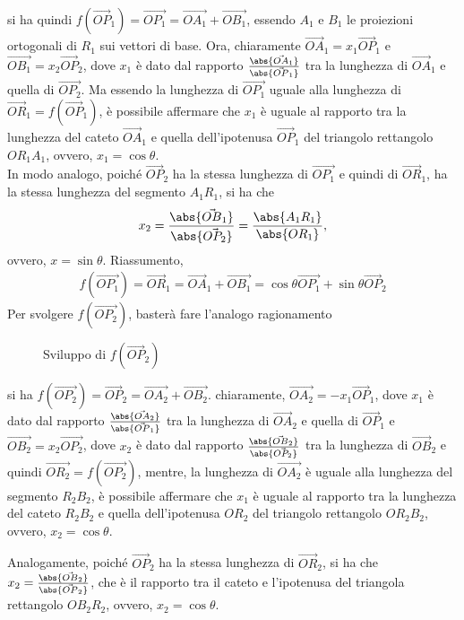 \begin{es}
\begin{enumerate}
    si ha quindi $f\left(\vec{OP}_1\right)=\vec{OP_1}=\vec{OA_1}+\vec{OB_1}$,
    essendo $A_1$ e $B_1$ le proiezioni ortogonali di $R_1$ sui vettori di
    base. Ora, chiaramente $\vec{OA}_1=x_1\vec{OP}_1$ e $\vec{OB_1}=x_2\vec{OP}_2$,
    dove $x_1$ è dato dal rapporto $\frac{\abs{\vec{OA}_1}}{\abs{\vec{OP}_1}}$ tra
    la lunghezza di $\vec{OA}_1$ e quella di $\vec{OP_2}$. Ma essendo la lunghezza
    di $\vec{OP_1}$ uguale alla lunghezza di $\vec{OR}_1=f(\vec{OP}_1)$, è possibile
    affermare che $x_1$ è uguale al rapporto tra la lunghezza del cateto $\vec{OA}_1$
    e quella dell'ipotenusa $\vec{OP}_1$ del triangolo rettangolo $OR_1A_1$, ovvero,
    $x_1=\cos\theta$.\\
    In modo analogo, poiché $\vec{OP}_2$ ha la stessa lunghezza di $\vec{OP_1}$ e
    quindi di $\vec{OR}_1$, ha la stessa lunghezza del segmento $A_1R_1$, si ha
    che
    \clearpage
    \begin{eqnarray*}
      x_2=\frac{\abs{\vec{OB}_1}}{\abs{\vec{OP_2}}}=\frac{\abs{A_1R_1}}{\abs{OR_1}},
    \end{eqnarray*}
    ovvero, $x=\sin\theta$. Riassumento,
    \begin{eqnarray}
      \label{eq:mtxAsaplin8}
      f(\vec{OP_1})=\vec{OR}_1=\vec{OA}_1+\vec{OB_1}=\cos{\theta}\vec{OP_1}+\sin\theta
      \vec{OP}_2
    \end{eqnarray}
    Per svolgere $f(\vec{OP_2})$, basterà fare l'analogo ragionamento
    \begin{figure}[ht!]
      \centering
      \resizebox{8cm}{!}{}
      \caption{Sviluppo di $f(\vec{OP}_2)$}
      \label{fig:mtxAsaplin3}
    \end{figure}

    si ha $f(\vec{OP_2})=\vec{OP}_2=\vec{OA_2}+\vec{OB_2}$. chiaramente,
    $\vec{OA_2}=-x_1\vec{OP}_1$, dove $x_1$ è dato dal rapporto $\frac{\abs{\vec{OA}_2}}
    {\abs{\vec{OP}_1}}$ tra la lunghezza di $\vec{OA}_2$ e quella di $\vec{OP}_1$ e
    $\vec{OB_2}=x_2\vec{OP_2}$, dove $x_2$ è dato dal rapporto $\frac{\abs{\vec{OB}_2}}
    {\abs{\vec{OP_2}}}$ tra la lunghezza di $\vec{OB}_2$ e quindi $\vec{OR_2}=f(\vec{OP_2})$,
    mentre, la lunghezza di $\vec{OA_2}$ è uguale alla lunghezza del segmento $R_2B_2$, è
    possibile affermare che $x_1$ è uguale al rapporto tra la lunghezza del cateto $R_2B_2$
    e quella dell'ipotenusa $OR_2$ del triangolo rettangolo $OR_2B_2$, ovvero, $x_2=\cos\theta$.
    
    Analogamente, poiché $\vec{OP}_2$ ha la stessa lunghezza di
    $\vec{OR}_2$, si ha che $x_2=\frac{\abs{\vec{OB}_2}}
    {\abs{\vec{OP}_2}}$, che è il rapporto tra il cateto e l'ipotenusa
    del triangola rettangolo $OB_2R_2$, ovvero, $x_2=\cos\theta$.


\end{enumerate}
\end{es}
